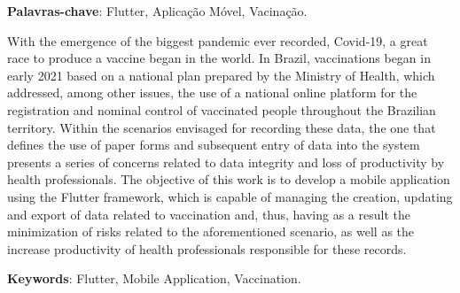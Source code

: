 
\vspace{1.5ex}

{\bf Palavras-chave}: Flutter, Aplicação Móvel, Vacinação.

%
%

With the emergence of the biggest pandemic ever recorded, Covid-19, a great race to produce a vaccine began in the world. In Brazil, vaccinations began in early 2021 based on a national plan prepared by the Ministry of Health, which addressed, among other issues, the use of a national online platform for the registration and nominal control of vaccinated people throughout the Brazilian territory. Within the scenarios envisaged for recording these data, the one that defines the use of paper forms and subsequent entry of data into the system presents a series of concerns related to data integrity and loss of productivity by health professionals. The objective of this work is to develop a mobile application using the Flutter framework, which is capable of managing the creation, updating and export of data related to vaccination and, thus, having as a result the minimization of risks related to the aforementioned scenario, as well as the increase productivity of health professionals responsible for these records.

\vspace{1.5ex}

{\bf Keywords}: Flutter, Mobile Application, Vaccination.
